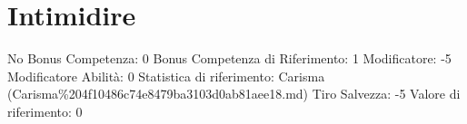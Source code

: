 \section{Intimidire}\label{intimidire}

\begin{description}
\tightlist
\item[Tags: ABI]
No Bonus Competenza: 0 Bonus Competenza di Riferimento: 1 Modificatore:
-5 Modificatore Abilità: 0 Statistica di riferimento: Carisma
(Carisma\%204f10486c74e8479ba3103d0ab81aee18.md) Tiro Salvezza: -5
Valore di riferimento: 0
\end{description}
